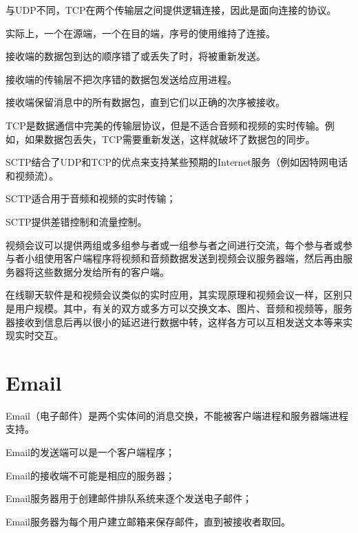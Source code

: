 与UDP不同，TCP在两个传输层之间提供逻辑连接，因此是面向连接的协议。

实际上，一个在源端，一个在目的端，序号的使用维持了连接。

\begin{compactitem}
\item 接收端的数据包到达的顺序错了或丢失了时，将被重新发送。
\item 接收端的传输层不把次序错的数据包发送给应用进程。
\item 接收端保留消息中的所有数据包，直到它们以正确的次序被接收。
\end{compactitem}

TCP是数据通信中完美的传输层协议，但是不适合音频和视频的实时传输。例如，如果数据包丢失，TCP需要重新发送，这样就破坏了数据包的同步。

SCTP结合了UDP和TCP的优点来支持某些预期的Internet服务（例如因特网电话和视频流）。

\begin{compactitem}
\item SCTP适合用于音频和视频的实时传输；
\item SCTP提供差错控制和流量控制。
\end{compactitem}



视频会议可以提供两组或多组参与者或一组参与者之间进行交流，每个参与者或参与者小组使用客户端程序将视频和音频数据发送到视频会议服务器端，然后再由服务器将这些数据分发给所有的客户端。

在线聊天软件是和视频会议类似的实时应用，其实现原理和视频会议一样，区别只是用户规模。其中，有关的双方或多方可以交换文本、图片、音频和视频等，服务器接收到信息后再以很小的延迟进行数据中转，这样各方可以互相发送文本等来实现实时交互。





\chapter{Email}



Email（电子邮件）是两个实体间的消息交换，不能被客户端进程和服务器端进程支持。

\begin{compactitem}
\item Email的发送端可以是一个客户端程序；
\item Email的接收端不可能是相应的服务器；
\item Email服务器用于创建邮件排队系统来逐个发送电子邮件；
\item Email服务器为每个用户建立邮箱来保存邮件，直到被接收者取回。
\end{compactitem}


